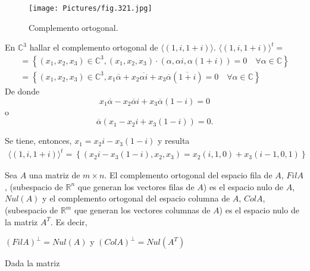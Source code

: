 {\begin{figure}
    \centering
    \texttt{[image: Pictures/fig.321.jpg]}
    \caption{Complemento ortogonal.}
    \label{321PROYORTOG}
\end{figure} 


\bigskip

\begin{example}
En $\mathbb{C}^3$ hallar el complemento ortogonal de $ \langle( 1,i,1+i) \rangle$.
$ \langle( 1,i,1+i) \rangle^t =$
\begin{eqnarray*}
   = \left \{ (x_1,x_2,x_3) \in \mathbb{C}^3, (x_1,x_2,x_3) \cdot (\alpha , \alpha i, \alpha (1+i))=0 \quad \forall \alpha \in \mathbb{C} \right \} \\
     = \left \{ (x_1,x_2,x_3) \in \mathbb{C}^3, x_1 \overline{\alpha} + x_2 \overline{\alpha i }  + x_3  \overline{\alpha}   (\overline{1+i})=0 \quad \forall \alpha \in \mathbb{C} \right \} 
\end{eqnarray*}
De donde  $$   x_1 \overline{\alpha} - x_2 \overline{\alpha} i + x_3 \overline{\alpha} (1-i)=0$$
o 
 $$    \overline{\alpha}( x_1 - x_2 i + x_3 (1-i))=0.$$
 
 Se tiene, entonces, $x_1= x_2 i - x_3 (1-i)$ y resulta 
\begin{eqnarray*}
    \langle( 1,i,1+i) \rangle^t =  \left \{ (x_2 i - x_3 (1-i), x_2, x_3 )= x_2(i,1,0) + x_3 (i-1,0,1) \right \}
\end{eqnarray*}
\end{example}

\bigskip
{}
\begin{corollary}
Sea $A$ una matriz de $m \times  n$. El complemento ortogonal del espacio fila de $A$, $Fil A$,  (subespacio de $\mathbb{R}^{n}$ que generan los vectores filas de $A$) es
el espacio nulo de $A$, $Nul(A)$ y el complemento ortogonal del espacio columna de $A$, $Col A$, (subespacio de $\mathbb{R}^{m}$ que generan los vectores columnas de $A$) es el
espacio nulo de la matriz $A^T$. Es decir,



\bigskip

$(Fil A)^{\perp} = Nul(A)$ y $(Col A)^{\perp} = Nul(A^T)$
\end{corollary}



\bigskip

\bigskip

\begin{example}
Dada la matriz



\end{example}}
